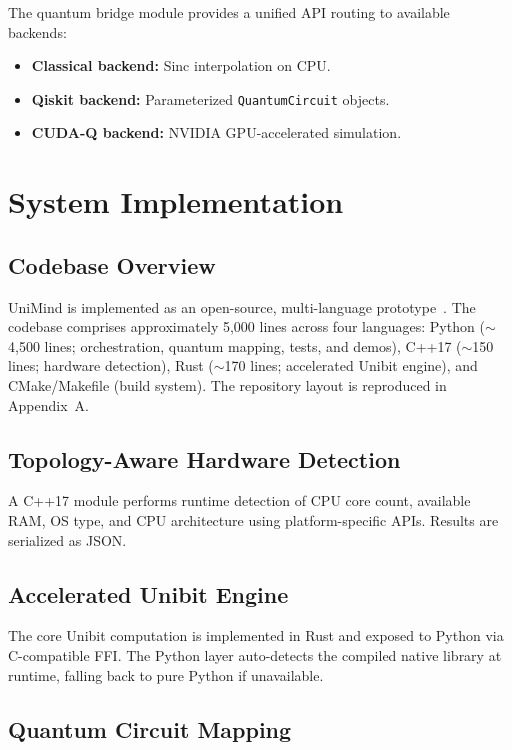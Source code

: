 ﻿\documentclass[12pt,a4paper]{article}
\begin{document}
The quantum bridge module provides a unified API routing to available backends:
\begin{itemize}
    \item \textbf{Classical backend:} Sinc interpolation on CPU.
    \item \textbf{Qiskit backend:} Parameterized \texttt{QuantumCircuit} objects.
    \item \textbf{CUDA-Q backend:} NVIDIA GPU-accelerated simulation.
\end{itemize}


\section{System Implementation}\label{sec:implementation}

\subsection{Codebase Overview}

UniMind is implemented as an open-source, multi-language prototype~\cite{tan2026}. The codebase comprises approximately 5,000 lines across four languages: Python ($\sim$4,500 lines; orchestration, quantum mapping, tests, and demos), C++17 ($\sim$150 lines; hardware detection), Rust ($\sim$170 lines; accelerated Unibit engine), and CMake/Makefile (build system). The repository layout is reproduced in Appendix~A.

\subsection{Topology-Aware Hardware Detection}

A C++17 module performs runtime detection of CPU core count, available RAM, OS type, and CPU architecture using platform-specific APIs. Results are serialized as JSON.

\subsection{Accelerated Unibit Engine}

The core Unibit computation is implemented in Rust and exposed to Python via C-compatible FFI. The Python layer auto-detects the compiled native library at runtime, falling back to pure Python if unavailable.

\subsection{Quantum Circuit Mapping}\label{sec:mapping}
\end{document}
